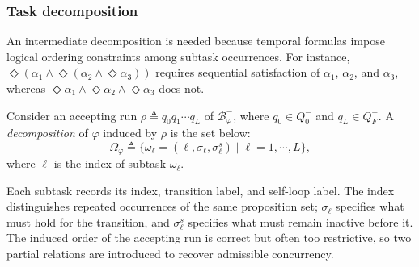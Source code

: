 \subsubsection{Task decomposition}
\label{ch04:subsubsec:task-decompose}

An intermediate decomposition is needed because temporal formulas impose
logical ordering constraints among subtask occurrences. For instance,
$\Diamond(\alpha_{1}\land\Diamond(\alpha_{2}\land\Diamond\alpha_{3}))$
requires sequential satisfaction of $\alpha_{1}$, $\alpha_{2}$, and
$\alpha_{3}$, whereas
$\Diamond\alpha_{1}\land\Diamond\alpha_{2}\land\Diamond\alpha_{3}$ does not.

\begin{definition}
\label{ch04:def:subtasks}
Consider an accepting run
$\rho \triangleq q_{0} q_{1} \cdots q_{L}$ of
$\mathcal{B}_{\varphi}^{-}$, where $q_{0} \in Q_{0}^{-}$ and
$q_{L} \in Q_{F}^{-}$. A \emph{decomposition} of $\varphi$ induced by $\rho$
is the set below:
\begin{equation}
\label{ch04:eq:subtask}
\Omega_{\varphi} \triangleq
\bigl\{\omega_{\ell}=(\ell,\sigma_{\ell},\sigma_{\ell}^{s})
\mid \ell=1,\cdots,L\bigr\},
\end{equation}
where $\ell$ is the index of subtask $\omega_{\ell}$.  
\end{definition}

Each subtask records its index, transition label, and self-loop label. The
index distinguishes repeated occurrences of the same proposition set;
$\sigma_{\ell}$ specifies what must hold for the transition, and
$\sigma_{\ell}^{s}$ specifies what must remain inactive before it. The induced
order of the accepting run is correct but often too restrictive, so two partial
relations are introduced to recover admissible concurrency.

